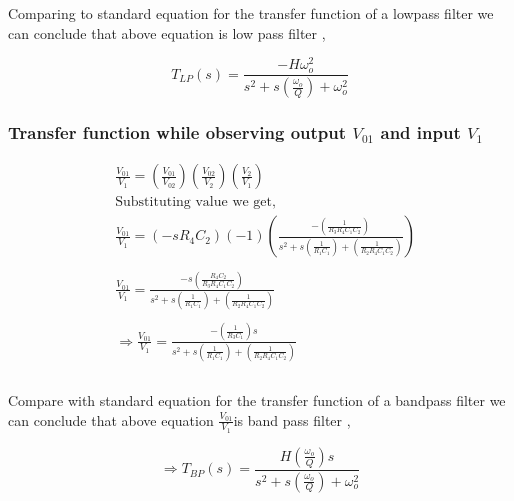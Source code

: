 \documentclass[a4paper,11pt]{article}
\newcommand\ddfrac[2]{\frac{\displaystyle #1}{\displaystyle #2}}
\begin{document}
Comparing to standard equation for the transfer function of a lowpass filter we can conclude that above equation is low pass filter ,

\begin{equation*}
    T_{LP}(s)=\ddfrac{-H\omega_o^2}{s^2+s\left(\frac{\omega_o}{Q}\right)+\omega_o^2}
\end{equation*}


\subsubsection*{Transfer function while observing output $V_{01}$ and input $V_{1}$}

\begin{equation*}
    \begin{aligned}
         & \frac{V_{01}}{V_1}=\left(\frac{V_{01}}{V_{02}}\right)\left(\frac{V_{02}}{V_2}\right)\left(\frac{V_2}{V_1}\right)                                                      \\
         & \text{Substituting value we get,}                                                                                                                                     \\
         & \frac{V_{01}}{V_{1}}=(-sR_4C_2)(-1)\left(\ddfrac{-\left(\frac{1}{R_3R_4C_1C_2}\right)}{s^2+s\left(\frac{1}{R_1C_1}\right)+\left(\frac{1}{R_2R_4C_1C_2}\right)}\right) \\\\
         & \frac{V_{01}}{V_{1}}=\ddfrac{-s\left(\frac{R_4C_2}{R_3R_4C_1C_2}\right)}{s^2+s\left(\frac{1}{R_1C_1}\right)+\left(\frac{1}{R_2R_4C_1C_2}\right)}                      \\\\
         & \Rightarrow\frac{V_{01}}{V_1}=\ddfrac{-\left(\frac{1}{R_3C_1}\right)s}{s^2+s\left(\frac{1}{R_1C_1}\right)+\left(\frac{1}{R_2R_4C_1C_2}\right)}                        \\\\
    \end{aligned}
\end{equation*}

Compare with  standard equation for the transfer function of a bandpass filter we can conclude that above equation $\ddfrac{V_{01}}{V_1} $is band pass filter ,

\begin{equation*}
    \Rightarrow T_{BP}(s)=\ddfrac{H\left(\frac{\omega_o}{Q}\right)s}{s^2+s\left(\frac{\omega_o}{Q}\right)+\omega_o^2}
\end{equation*}
\end{document}
